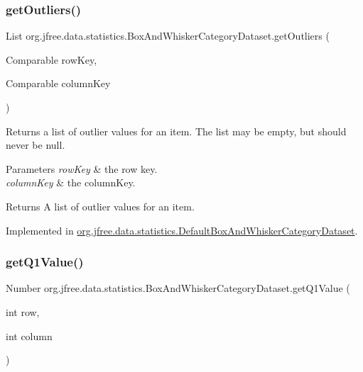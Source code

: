 \subsubsection{\texorpdfstring{get\+Outliers()}{getOutliers()}\hspace{0.1cm}{\footnotesize\ttfamily [2/2]}}
{\footnotesize\ttfamily List org.\+jfree.\+data.\+statistics.\+Box\+And\+Whisker\+Category\+Dataset.\+get\+Outliers (\begin{DoxyParamCaption}\item[{Comparable}]{row\+Key,  }\item[{Comparable}]{column\+Key }\end{DoxyParamCaption})}

Returns a list of outlier values for an item. The list may be empty, but should never be {\ttfamily null}.


\begin{DoxyParams}{Parameters}
{\em row\+Key} & the row key. \\
\hline
{\em column\+Key} & the column\+Key.\\
\hline
\end{DoxyParams}
\begin{DoxyReturn}{Returns}
A list of outlier values for an item. 
\end{DoxyReturn}


Implemented in \mbox{\hyperlink{classorg_1_1jfree_1_1data_1_1statistics_1_1_default_box_and_whisker_category_dataset_ac2079ef29d157fe4fc20e8659fe01741}{org.\+jfree.\+data.\+statistics.\+Default\+Box\+And\+Whisker\+Category\+Dataset}}.

\mbox{\label{interfaceorg_1_1jfree_1_1data_1_1statistics_1_1_box_and_whisker_category_dataset_a174d2b0408011a2efda5b82af2fd2dd8}} 
\subsubsection{\texorpdfstring{get\+Q1\+Value()}{getQ1Value()}\hspace{0.1cm}{\footnotesize\ttfamily [1/2]}}
{\footnotesize\ttfamily Number org.\+jfree.\+data.\+statistics.\+Box\+And\+Whisker\+Category\+Dataset.\+get\+Q1\+Value (\begin{DoxyParamCaption}\item[{int}]{row,  }\item[{int}]{column }\end{DoxyParamCaption})}

